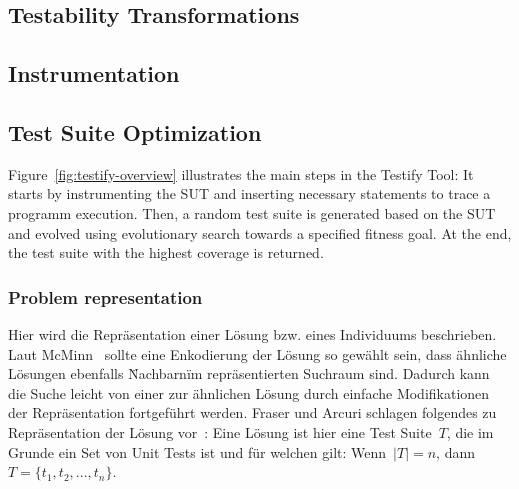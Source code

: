 \documentclass{article}
\begin{document}
\subsection{Testability Transformations}
\subsection{Instrumentation}
\subsection{Test Suite Optimization}
Figure~\cref{fig:testify-overview} illustrates the main steps in the Testify Tool: It starts by instrumenting the \ac{SUT} and inserting necessary statements to trace a programm execution. Then, a random test suite is generated based on the \ac{SUT} and evolved using evolutionary search towards a specified fitness goal. At the end, the test suite with the highest coverage is returned. 

\subsubsection{Problem representation}
Hier wird die Repräsentation einer Lösung bzw. eines Individuums beschrieben. Laut McMinn~\cite{McMinn_2004} sollte eine Enkodierung der Lösung so gewählt sein, dass ähnliche Lösungen ebenfalls \"Nachbarn\" im repräsentierten Suchraum sind. Dadurch kann die Suche leicht von einer zur ähnlichen Lösung durch einfache Modifikationen der Repräsentation fortgeführt werden. Fraser und Arcuri schlagen folgendes zu Repräsentation der Lösung vor~\cite{Fraser_2011}: Eine Lösung ist hier eine Test Suite~$T$, die im Grunde ein Set von Unit Tests ist und für welchen gilt: Wenn~$|T| = n$, dann~$T = \{t_1, t_2, ... ,t_n\}$. 
\end{document}
